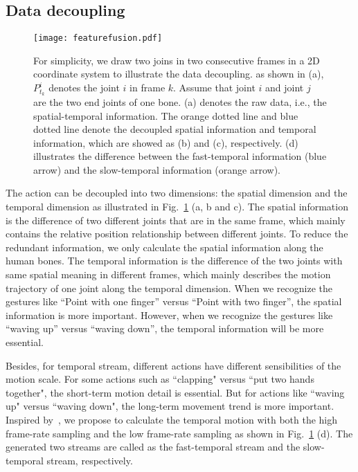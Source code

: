 \documentclass[runningheads]{llncs}
\begin{document}
\subsection{Data decoupling}
\label{sec:decouple}
\begin{figure}[tb]
    \centering
    \texttt{[image: featurefusion.pdf]}
    \caption{
For simplicity, we draw two joins in two consecutive frames in a 2D coordinate system to illustrate the data decoupling. 
as shown in (a), $P^{i}_{t_{k}}$ denotes the joint $i$ in frame $k$. Assume that joint $i$ and joint $j$ are the two end joints of one bone. (a) denotes the raw data, i.e., the spatial-temporal information. The orange dotted line and blue dotted line denote the decoupled spatial information and temporal information, which are showed as (b) and (c), respectively. 
    (d) illustrates the difference between the fast-temporal information (blue arrow) and the slow-temporal information (orange arrow). 
    }
    \label{fig:featurefusion}
\end{figure}{}

The action can be decoupled into two dimensions: the spatial dimension and the temporal dimension as illustrated in Fig.~\ref{fig:featurefusion} (a, b and c). 
The spatial information is the difference of two different  joints that are in the same frame, which mainly contains the relative position relationship between different joints. 
To reduce the redundant information, we only calculate the spatial information along the human bones. 
The temporal information is the difference of the two joints with same spatial meaning in different frames, which mainly describes the motion trajectory of one joint along the temporal dimension. 
When we recognize the gestures like ``Point with one finger'' versus ``Point with two finger'', the spatial information is more important. 
However, when we recognize the gestures like ``waving up'' versus ``waving down'', the temporal information will be more essential. 



Besides, for temporal stream, different actions have different sensibilities of the motion scale. 
For some actions such as ``clapping" versus ``put two hands together", the short-term motion detail is essential. But for actions like ``waving up" versus ``waving down", the long-term movement trend is more important. 
Inspired by~\cite{feichtenhofer_slowfast_2019}, we propose to calculate the temporal motion with both the high frame-rate sampling and the low frame-rate sampling as shown in Fig.~\ref{fig:featurefusion} (d). 
The generated two streams are called as the fast-temporal stream and the slow-temporal stream, respectively. 
\end{document}
